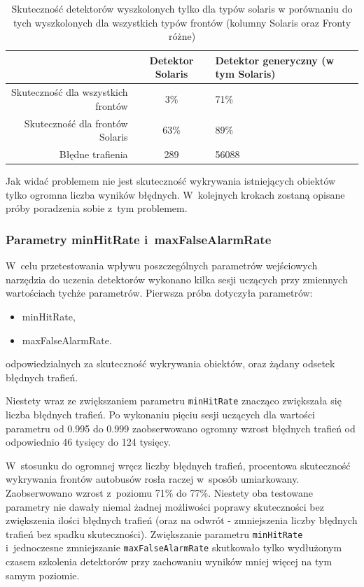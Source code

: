 \begin{table}[!h]
    \centering
    \begin{tabular}{r|c|l}
          & Detektor Solaris    & Detektor generyczny (w tym Solaris) \\
          \hline
Skuteczność dla wszystkich frontów & 3\%  & 71\%      \\
Skuteczność dla frontów Solaris    & 63\% & 89\%      \\
Błędne trafienia                   & 289  & 56088    \\
    \end{tabular}
    \caption{Skuteczność detektorów wyszkolonych tylko dla typów
    solaris w porównaniu do tych wyszkolonych dla wszystkich typów frontów
    (kolumny Solaris oraz Fronty różne)}
    \label{tab:sol_vs_all}
\end{table}

Jak widać problemem nie jest skuteczność wykrywania istniejących obiektów
tylko ogromna liczba wyników błędnych. W~kolejnych krokach zostaną opisane
próby poradzenia sobie z~tym problemem.

\subsubsection{Parametry minHitRate i~maxFalseAlarmRate}

W~celu przetestowania wpływu poszczególnych parametrów wejściowych
narzędzia do uczenia detektorów wykonano kilka sesji uczących 
przy zmiennych wartościach tychże parametrów. Pierwsza próba dotyczyła
parametrów:
\begin{itemize}
    \item minHitRate,
    \item maxFalseAlarmRate.
\end{itemize}
odpowiedzialnych za skuteczność wykrywania obiektów,
oraz żądany odsetek błędnych trafień.

Niestety wraz ze zwiększaniem parametru \verb|minHitRate|
znacząco zwiększała
się liczba błędnych trafień. Po wykonaniu pięciu sesji
uczących dla wartości parametru od 0.995 do 0.999 zaobserwowano 
ogromny wzrost błędnych trafień od odpowiednio 46 tysięcy
do 124 tysięcy.


W~stosunku do ogromnej wręcz liczby błędnych trafień, procentowa skuteczność
wykrywania frontów autobusów rosła raczej w~sposób umiarkowany.
Zaobserwowano wzrost z~poziomu 71\% do 77\%. 
Niestety oba testowane parametry nie dawały niemal żadnej
możliwości poprawy skuteczności bez zwiększenia ilości błędnych
trafień (oraz na odwrót - zmniejszenia liczby
błędnych trafień bez spadku skuteczności).
Zwiększanie parametru \verb|minHitRate| i~jednoczesne zmniejszanie
\verb|maxFalseAlarmRate| skutkowało tylko wydłużonym czasem
szkolenia detektorów przy zachowaniu wyników mniej więcej na
tym samym poziomie.


